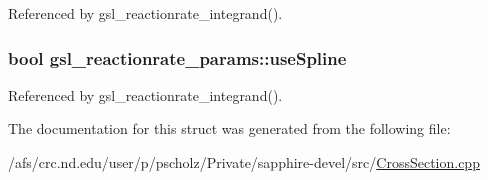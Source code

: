 Referenced by gsl\-\_\-reactionrate\-\_\-integrand().

\hypertarget{structgsl__reactionrate__params_ac8d064fc50f87de0d067926ba0f2abb7}{
\subsubsection[{use\-Spline}]{\setlength{\rightskip}{0pt plus 5cm}bool gsl\-\_\-reactionrate\-\_\-params\-::use\-Spline}}\label{structgsl__reactionrate__params_ac8d064fc50f87de0d067926ba0f2abb7}


Referenced by gsl\-\_\-reactionrate\-\_\-integrand().



The documentation for this struct was generated from the following file\-:\begin{DoxyCompactItemize}
\item 
/afs/crc.\-nd.\-edu/user/p/pscholz/\-Private/sapphire-\/devel/src/\hyperlink{CrossSection_8cpp}{Cross\-Section.\-cpp}\end{DoxyCompactItemize}
